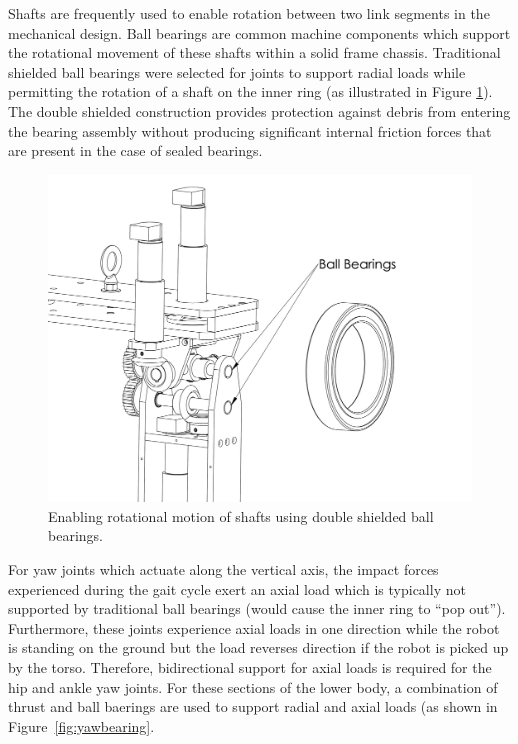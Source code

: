 Shafts are frequently used to enable rotation between two link segments in the mechanical design. Ball bearings are common machine components which support the rotational movement of these shafts within a solid frame chassis. Traditional shielded ball bearings were selected for joints to support radial loads while permitting the rotation of a shaft on the inner ring (as illustrated in Figure \ref{fig:ballb}). The double shielded construction provides protection against debris from entering the bearing assembly without producing significant internal friction forces that are present in the case of sealed bearings. 

\begin{figure}[!h]
	\begin{center}
    \includegraphics[scale=0.5]{fig/design/ballbearings.pdf}
	\end{center}
  \caption{Enabling rotational motion of shafts using double shielded ball bearings.}
\label{fig:ballb}
\end{figure}

For yaw joints which actuate along the vertical axis, the impact forces experienced during the gait cycle exert an axial load which is typically not supported by traditional ball bearings (would cause the inner ring to ``pop out''). Furthermore, these joints experience axial loads in one direction while the robot is standing on the ground but the load reverses direction if the robot is picked up by the torso. Therefore, bidirectional support for axial loads is required for the hip and ankle yaw joints. For these sections of the lower body, a combination of thrust and ball baerings are used to support radial and axial loads (as shown in Figure~\ref{fig:yawbearing}. 

